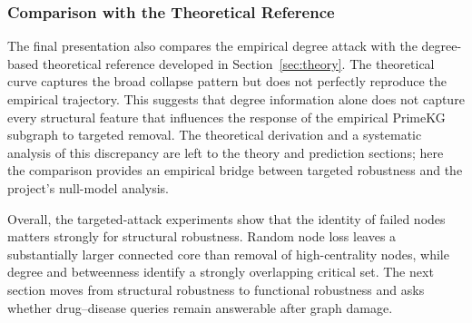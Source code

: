 \subsubsection{Comparison with the Theoretical Reference}
The final presentation also compares the empirical degree attack with the degree-based theoretical reference developed in Section~\ref{sec:theory}. The theoretical curve captures the broad collapse pattern but does not perfectly reproduce the empirical trajectory. This suggests that degree information alone does not capture every structural feature that influences the response of the empirical PrimeKG subgraph to targeted removal. The theoretical derivation and a systematic analysis of this discrepancy are left to the theory and prediction sections; here the comparison provides an empirical bridge between targeted robustness and the project's null-model analysis.

Overall, the targeted-attack experiments show that the identity of failed nodes matters strongly for structural robustness. Random node loss leaves a substantially larger connected core than removal of high-centrality nodes, while degree and betweenness identify a strongly overlapping critical set. The next section moves from structural robustness to functional robustness and asks whether drug--disease queries remain answerable after graph damage.
